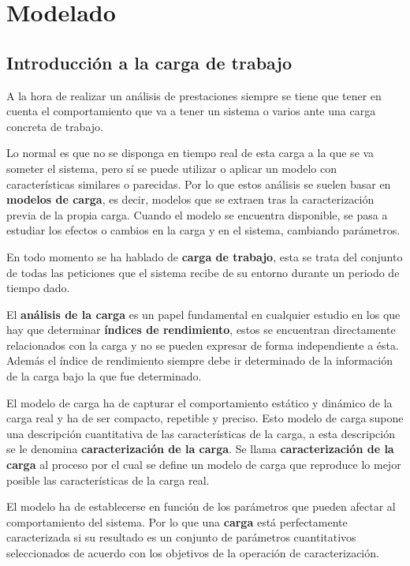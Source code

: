 \chapter{Modelado} \label{ch:introduction}

\section{Introducción a la carga de trabajo}
\cite{modelado}
A la hora de realizar un análisis de prestaciones siempre se tiene que tener en cuenta el comportamiento que va a tener un sistema o varios ante una carga concreta de trabajo.

Lo normal es que no se disponga en tiempo real de esta carga a la que se va someter el sistema, pero sí se puede utilizar o aplicar un modelo con características similares o parecidas. Por lo que estos análisis se suelen basar en \textbf{modelos de carga}, es decir, modelos que se extraen tras la caracterización previa de la propia carga. Cuando el modelo se encuentra disponible, se pasa a estudiar los efectos o cambios en la carga y en el sistema, cambiando parámetros.

En todo momento se ha hablado de \textbf{carga de trabajo}, esta se trata del conjunto de todas las peticiones que el sistema recibe de su entorno durante un periodo de tiempo dado.

El \textbf{análisis de la carga} es un papel fundamental en cualquier estudio en los que hay que determinar \textbf{índices de rendimiento}, estos se encuentran directamente relacionados con la carga y no se pueden expresar de forma independiente a ésta. Además el índice de rendimiento siempre debe ir determinado de la información de la carga bajo la que fue determinado.

El modelo de carga ha de capturar el comportamiento estático y dinámico de la carga real y ha de ser compacto, repetible y preciso. Esto modelo de carga supone una descripción cuantitativa de las características de la carga, a esta descripción se le denomina \textbf{caracterización de la carga}.
\newpage
Se llama \textbf{caracterización de la carga} al proceso por el cual se define un modelo de carga que reproduce lo mejor posible las características de la carga real.

El modelo ha de establecerse en función de los parámetros que pueden afectar al comportamiento del sistema. Por lo que una \textbf{carga} está perfectamente caracterizada si su resultado es un conjunto de parámetros cuantitativos seleccionados de acuerdo con los objetivos de la operación de caracterización.

